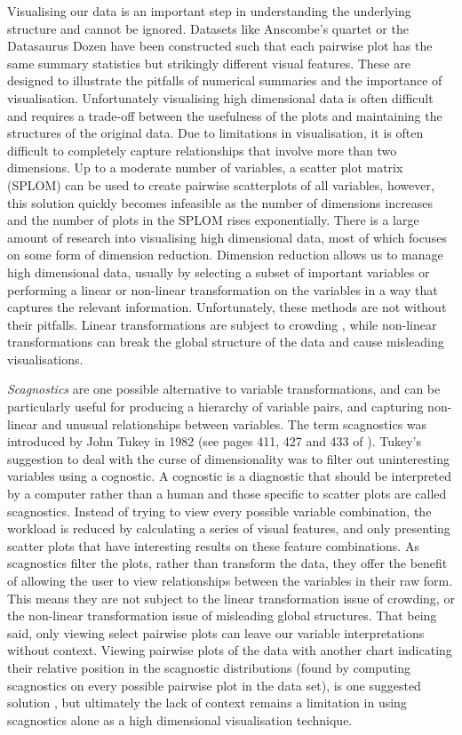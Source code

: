 Visualising our data is an important step in understanding the underlying structure and cannot be ignored. Datasets like Anscombe's quartet \citep{anscombe} or the Datasaurus Dozen \citep{datasaurpkg} have been constructed such that each pairwise plot has the same summary statistics but strikingly different visual features. These are designed to illustrate the pitfalls of numerical summaries and the importance of visualisation. Unfortunately visualising high dimensional data is often difficult and requires a trade-off between the usefulness of the plots and maintaining the structures of the original data. Due to limitations in visualisation, it is often difficult to completely capture relationships that involve more than two dimensions. Up to a moderate number of variables, a scatter plot matrix (SPLOM) can be used to create pairwise scatterplots of all variables, however, this solution quickly becomes infeasible as the number of dimensions increases and the number of plots in the SPLOM rises exponentially. There is a large amount of research into visualising high dimensional data, most of which focuses on some form of dimension reduction. Dimension reduction allows us to manage high dimensional data, usually by selecting a subset of important variables or performing a linear or non-linear transformation on the variables in a way that captures the relevant information. Unfortunately, these methods are not without their pitfalls. Linear transformations are subject to crowding \citep{crowding}, while non-linear transformations can break the global structure of the data and cause misleading visualisations.

\emph{Scagnostics} are one possible alternative to variable transformations, and can be particularly useful for producing a hierarchy of variable pairs, and capturing non-linear and unusual relationships between variables. The term scagnostics was introduced by John Tukey in 1982 (see pages 411, 427 and 433 of \citet{tukey}). Tukey's suggestion to deal with the curse of dimensionality was to filter out uninteresting variables using a cognostic. A cognostic is a diagnostic that should be interpreted by a computer rather than a human and those specific to scatter plots are called scagnostics. Instead of trying to view every possible variable combination, the workload is reduced by calculating a series of visual features, and only presenting scatter plots that have interesting results on these feature combinations. As scagnostics filter the plots, rather than transform the data, they offer the benefit of allowing the user to view relationships between the variables in their raw form. This means they are not subject to the linear transformation issue of crowding, or the non-linear transformation issue of misleading global structures. That being said, only viewing select pairwise plots can leave our variable interpretations without context. Viewing pairwise plots of the data with another chart indicating their relative position in the scagnostic distributions (found by computing scagnostics on every possible pairwise plot in the data set), is one suggested solution \citep{scagexplorer}, but ultimately the lack of context remains a limitation in using scagnostics alone as a high dimensional visualisation technique.


